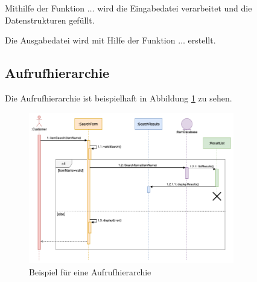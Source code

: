 Mithilfe der Funktion $\ldots$ wird die Eingabedatei verarbeitet und die Datenstrukturen gefüllt.

Die Ausgabedatei wird mit Hilfe der Funktion $\ldots$ erstellt.

\subsection{Aufrufhierarchie}
\label{ssec:aufrufhierarchie}

Die Aufrufhierarchie ist beispielhaft in Abbildung \ref{fig:example_sequence_diagram} zu sehen.

\begin{figure}[H]
    \centering
    \includegraphics[width=0.8\textwidth]{figures/example_sequence_diagram.png}
    \caption{Beispiel für eine Aufrufhierarchie}
    \label{fig:example_sequence_diagram}
\end{figure}